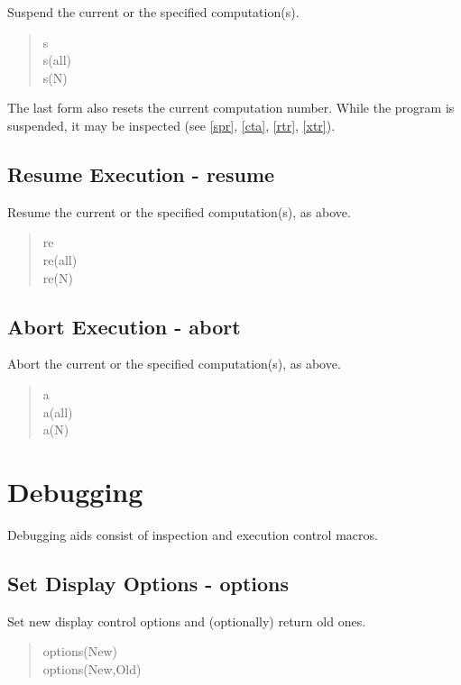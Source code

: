 Suspend the current or the specified computation(s).

\begin{verse}
    s \\
    s(all) \\
    s(N)
\end{verse}

\noindent
The last form also resets the current computation number.
While the program is suspended, it may be inspected (see
\ref{spr}, \ref{cta}, \ref{rtr}, \ref{xtr}).

\subsection{Resume Execution - resume}
\label{resume}
Resume the current or the specified computation(s), as above.

\begin{verse}
    re \\
    re(all) \\
    re(N)
\end{verse}

\subsection{Abort Execution - abort}

Abort the current or the specified computation(s), as above.

\begin{verse}
    a \\
    a(all) \\
    a(N)
\end{verse}


\section{Debugging}

Debugging aids consist of inspection and execution control macros.

\subsection{Set Display Options - options}
\label{options}

Set new display control options and (optionally) return old ones.

\begin{verse}
    options(New) \\
    options(New,Old)
\end{verse}

